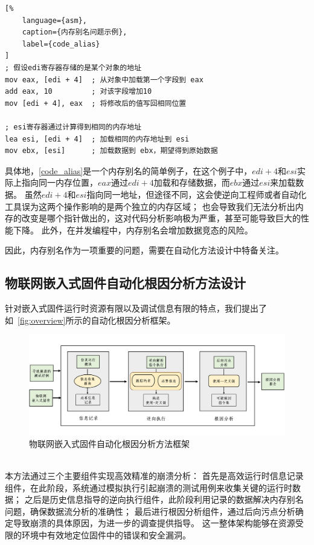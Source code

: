 \begin{lstlisting}[%
    language={asm},
    caption={内存别名问题示例},
    label={code_alias}
]
; 假设edi寄存器存储的是某个对象的地址
mov eax, [edi + 4]  ; 从对象中加载第一个字段到 eax
add eax, 10         ; 对该字段增加10
mov [edi + 4], eax  ; 将修改后的值写回相同位置

; esi寄存器通过计算得到相同的内存地址
lea esi, [edi + 4]  ; 加载相同的内存地址到 esi
mov ebx, [esi]      ; 加载数据到 ebx，期望得到原始数据
\end{lstlisting}

具体地，\autoref{code_alias}是一个内存别名的简单例子，在这个例子中，$edi+4$和$esi$实际上指向同一内存位置，$eax$通过$edi + 4$加载和存储数据，而$ebx$通过$esi$来加载数据。
虽然$edi+4$和$esi$指向同一地址，但途径不同，这会使逆向工程师或者自动化工具误为这两个操作影响的是两个独立的内存区域；
也会导致我们无法分析出内存的改变是哪个指针做出的，这对代码分析影响极为严重，甚至可能导致巨大的性能下降。
此外，在并发编程中，内存别名会增加数据竞态的风险。

因此，内存别名作为一项重要的问题，需要在自动化方法设计中特备关注。

\subsection{物联网嵌入式固件自动化根因分析方法设计} %
针对嵌入式固件运行时资源有限以及调试信息有限的特点，我们提出了如~\autoref{fig:overview}所示的自动化根因分析框架。
\begin{figure}[h]
    \centering
    \includegraphics[width=1.0\textwidth]{./figure/Overview.png}
    \caption{物联网嵌入式固件自动化根因分析方法框架}
    \label{fig:overview}
\end{figure}\\

本方法通过三个主要组件实现高效精准的崩溃分析：
首先是高效运行时信息记录组件，在此阶段，系统通过模拟执行引起崩溃的测试用例来收集关键的运行时数据；
之后是历史信息指导的逆向执行组件，此阶段利用记录的数据解决内存别名问题，确保数据流分析的准确性；
最后进行根因分析组件，通过后向污点分析确定导致崩溃的具体原因，为进一步的调查提供指导。
这一整体架构能够在资源受限的环境中有效地定位固件中的错误和安全漏洞。

